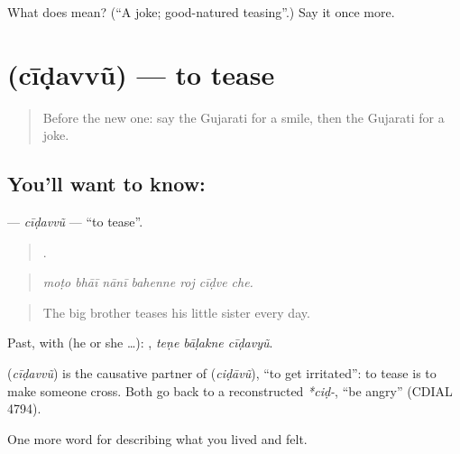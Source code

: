 \begin{tcolorbox}[breakable,colback=teal!4,colframe=teal!35!black,title={Before you move on}]
What does  mean? (\textquotedblleft{}A joke; good-natured teasing\textquotedblright{}.) Say it once more.
\end{tcolorbox}
\section[\texorpdfstring{\gu{ચીડવવું} (cīḍavvũ)}{ચીડવવું (cīḍavvũ)}]{ (cīḍavvũ) — to tease}

\label{lesson:GU-C448-cidavvu}



\begin{quote}
Before the new one: say the Gujarati for a smile, then the Gujarati for a joke.
\end{quote}

\subsection*{You'll want to know: }
\textbf{} — \emph{cīḍavvũ} — \textquotedblleft{}to tease\textquotedblright{}.

\begin{quote}
      .
\end{quote}

\begin{quote}
\emph{moṭo bhāī nānī bahenne roj cīḍve che.}
\end{quote}

\begin{quote}
The big brother teases his little sister every day.
\end{quote}

Past, with  (he or she …):   , \emph{teṇe bāḷakne cīḍavyũ}.

\begin{cousinweb}
\textbf{} (\emph{cīḍavvũ}) is the causative partner of \textbf{} (\emph{ciḍāvũ}), \textquotedblleft{}to get irritated\textquotedblright{}: to tease is to make someone cross. Both go back to a reconstructed \emph{*ciḍ-}, \textquotedblleft{}be angry\textquotedblright{} (CDIAL 4794).
\end{cousinweb}

\begin{grammarlens}[title={What you've built}]
One more word for describing what you lived and felt.
\end{grammarlens}

